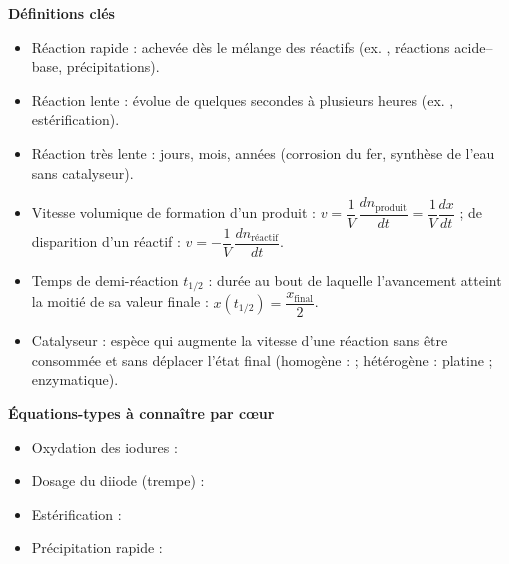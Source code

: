 \documentclass[11pt]{article}
\newcommand{\cle}[1]{{\popxbold\color{popdark}#1}}
\begin{document}
\begin{bilan}
\textbf{Définitions clés}
\begin{itemize}
  \item \cle{Réaction rapide} : achevée dès le mélange des réactifs (ex. , réactions acide--base, précipitations).
  \item \cle{Réaction lente} : évolue de quelques secondes à plusieurs heures (ex. , estérification).
  \item \cle{Réaction très lente} : jours, mois, années (corrosion du fer, synthèse de l'eau sans catalyseur).
  \item \cle{Vitesse volumique} de formation d'un produit : $v = \dfrac{1}{V}\,\dfrac{dn_{\text{produit}}}{dt} = \dfrac{1}{V}\dfrac{dx}{dt}$ ; de disparition d'un réactif : $v = -\dfrac{1}{V}\,\dfrac{dn_{\text{réactif}}}{dt}$.
  \item \cle{Temps de demi-réaction} $t_{1/2}$ : durée au bout de laquelle l'avancement atteint la moitié de sa valeur finale : $x(t_{1/2}) = \dfrac{x_{\text{final}}}{2}$.
  \item \cle{Catalyseur} : espèce qui augmente la vitesse d'une réaction sans être consommée et sans déplacer l'état final (homogène :  ; hétérogène : platine ; enzymatique).
\end{itemize}

\textbf{Équations-types à connaître par c\oe ur}
\begin{itemize}
  \item Oxydation des iodures : 
  \item Dosage du diiode (trempe) : 
  \item Estérification : 
  \item Précipitation rapide : 
\end{itemize}


\end{bilan}
\end{document}
